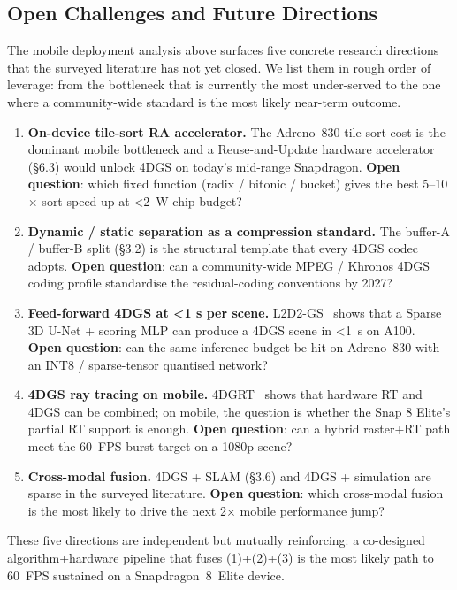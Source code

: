 

\subsection{Open Challenges and Future Directions}
The mobile deployment analysis above surfaces five concrete
research directions that the surveyed literature has not yet
closed. We list them in rough order of leverage: from the
bottleneck that is currently the most under-served to the one
where a community-wide standard is the most likely near-term
outcome.
\begin{enumerate}
  \item \textbf{On-device tile-sort RA accelerator.} The
        Adreno~830 tile-sort cost is the dominant mobile
        bottleneck and a Reuse-and-Update hardware accelerator
        (\S6.3) would unlock 4DGS on today's mid-range
        Snapdragon. \textbf{Open question}: which fixed
        function (radix / bitonic / bucket) gives the best
        5--10$\times$ sort speed-up at <2~W chip budget?
  \item \textbf{Dynamic / static separation as a compression
        standard.} The buffer-A / buffer-B split (\S3.2) is
        the structural template that every 4DGS codec adopts.
        \textbf{Open question}: can a community-wide
        MPEG / Khronos 4DGS coding profile standardise the
        residual-coding conventions by 2027?
  \item \textbf{Feed-forward 4DGS at <1 s per scene.}
        L2D2-GS~\cite{song2026l2d2gs} shows that a Sparse 3D
        U-Net + scoring MLP can produce a 4DGS scene in
        <1~s on A100. \textbf{Open question}: can the same
        inference budget be hit on Adreno~830 with an
        INT8 / sparse-tensor quantised network?
  \item \textbf{4DGS ray tracing on mobile.} 4DGRT~\cite{liu20254dgrt}
        shows that hardware RT and 4DGS can be combined; on
        mobile, the question is whether the Snap 8 Elite's
        partial RT support is enough. \textbf{Open question}:
        can a hybrid raster+RT path meet the 60~FPS burst
        target on a 1080p scene?
  \item \textbf{Cross-modal fusion.} 4DGS + SLAM
        (\S3.6) and 4DGS + simulation are sparse in the
        surveyed literature. \textbf{Open question}: which
        cross-modal fusion is the most likely to drive the
        next 2$\times$ mobile performance jump?
\end{enumerate}
These five directions are independent but mutually reinforcing:
a co-designed algorithm+hardware pipeline that fuses
(1)+(2)+(3) is the most likely path to 60~FPS sustained on a
Snapdragon~8~Elite device.

